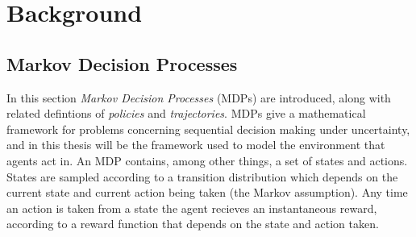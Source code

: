 

\chapter{\label{ch:2-background}Background}

    \minitoc









    


\section{Markov Decision Processes}
\label{sec:2-1-mdps}



    In this section \textit{Markov Decision Processes} (MDPs) are introduced, along with related defintions of \textit{policies} and \textit{trajectories}. MDPs give a mathematical framework for problems concerning sequential decision making under uncertainty, and in this thesis will be the framework used to model the environment that agents act in. An MDP contains, among other things, a set of states and actions. States are sampled according to a transition distribution which depends on the current state and current action being taken (the Markov assumption). Any time an action is taken from a state the agent recieves an instantaneous reward, according to a reward function that depends on the state and action taken.

